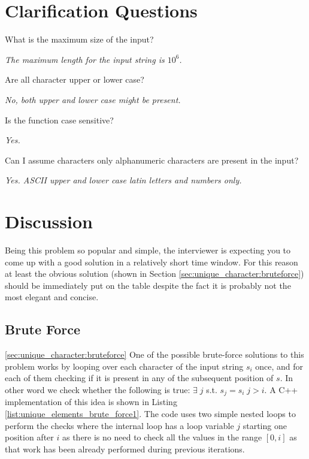 \section{Clarification Questions}

\begin{QandA}
	\item What is the maximum size of the input?
	\begin{answered}
		\textit{The maximum length for the input string is $10^6$.}
	\end{answered}
	
	\item Are all character upper or lower case?
	\begin{answered}
		\textit{No, both upper and lower case might be present.}
	\end{answered}

	\item Is the function case sensitive?
	\begin{answered}
		\textit{Yes.}
	\end{answered}

	\item Can I assume characters only alphanumeric characters are present in the input?
	\begin{answered}
		\textit{Yes. ASCII upper and lower case latin letters and numbers only.}
	\end{answered}
\end{QandA}

\section{Discussion}
Being this problem so popular and simple, the interviewer is expecting you to come up
with a good solution in a relatively short time window. 
For this reason at least the obvious solution (shown in Section \ref{sec:unique_character:bruteforce})
should be immediately put on the table despite the fact it is probably not the most elegant and concise.

\subsection{Brute Force}
\ref{sec:unique_character:bruteforce}
One of the possible brute-force solutions to this problem works by looping
over each character of the input string $s_i$ once,
and for each of them checking if it is present in any of the subsequent position of $s$. 
In other word we check whether the following is true: $\exists \; j $ s.t.  $s_j=s_i \; j>i$.
A C++ implementation of this idea is shown in Listing \ref{list:unique_elements_brute_force1}. 
The code uses two simple nested loops to perform the checks where the internal loop has a
loop variable $j$ starting one position after $i$ as there is no need to check
all the values in the range $[0,i]$ as that work has been already performed during previous iterations. 


